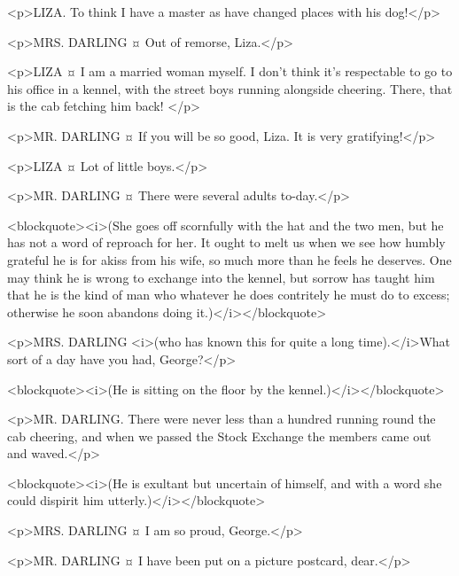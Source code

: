 <p>LIZA. To think I have a master as have changed places with his dog!</p>

<p>MRS. DARLING ¤
Out of remorse, Liza.</p>

<p>LIZA ¤
I am a married woman myself. I don't think it's respectable to go to his office in a kennel, with the street boys running alongside cheering.
There, that is the cab fetching him back!
</p>

<p>MR. DARLING ¤
If you will be so good, Liza.
It is very gratifying!</p>

<p>LIZA ¤
Lot of little boys.</p>

<p>MR. DARLING ¤
There were several adults to-day.</p>

<blockquote><i>(She goes off scornfully with the hat and the two men, but he has not a word of reproach for her. It ought to melt us when we see how humbly grateful he is for akiss from his wife, so much more than he feels he deserves. One may think he is wrong to exchange into the kennel, but sorrow has taught him that he is the kind of man who whatever he does contritely he must do to excess; otherwise he soon abandons doing it.)</i></blockquote>

<p>MRS. DARLING <i>(who has known this for quite a long time).</i>What sort of a day have you had, George?</p>

<blockquote><i>(He is sitting on the floor by the kennel.)</i></blockquote>

<p>MR. DARLING. There were never less than a hundred running round the cab cheering, and when we passed the Stock Exchange the members came out and waved.</p>

<blockquote><i>(He is exultant but uncertain of himself, and with a word she could dispirit him utterly.)</i></blockquote>

<p>MRS. DARLING ¤
I am so proud, George.</p>

<p>MR. DARLING ¤
I have been put on a picture postcard, dear.</p>

